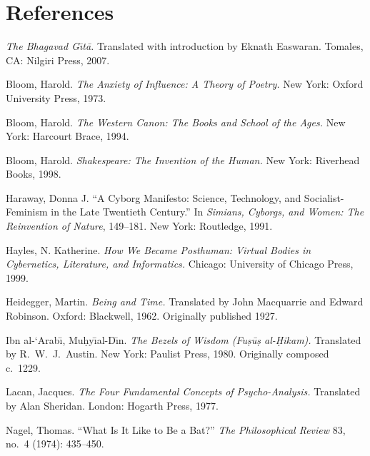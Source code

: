 \documentclass[11pt]{article}
\begin{document}
\section*{References}
\begin{description}[leftmargin=2em, style=unboxed, itemsep=0.35em]

\item[] \emph{The Bhagavad G\=\i t\=a.} Translated with introduction by Eknath Easwaran. Tomales, CA: Nilgiri Press, 2007.

\item[] Bloom, Harold. \emph{The Anxiety of Influence: A Theory of Poetry.} New York: Oxford University Press, 1973.

\item[] Bloom, Harold. \emph{The Western Canon: The Books and School of the Ages.} New York: Harcourt Brace, 1994.

\item[] Bloom, Harold. \emph{Shakespeare: The Invention of the Human.} New York: Riverhead Books, 1998.

\item[] Haraway, Donna J. \enquote{A Cyborg Manifesto: Science, Technology, and Socialist-Feminism in the Late Twentieth Century.} In \emph{Simians, Cyborgs, and Women: The Reinvention of Nature}, 149--181. New York: Routledge, 1991.

\item[] Hayles, N. Katherine. \emph{How We Became Posthuman: Virtual Bodies in Cybernetics, Literature, and Informatics.} Chicago: University of Chicago Press, 1999.

\item[] Heidegger, Martin. \emph{Being and Time.} Translated by John Macquarrie and Edward Robinson. Oxford: Blackwell, 1962. Originally published 1927.

\item[] Ibn al-{`}Arab\=\i, Mu\d{h}y\=\i al-D\=\i n. \emph{The Bezels of Wisdom (Fu\d{s}\=u\d{s} al-\d{H}ikam).} Translated by R.\ W.\ J.\ Austin. New York: Paulist Press, 1980. Originally composed c.\ 1229.

\item[] Lacan, Jacques. \emph{The Four Fundamental Concepts of Psycho-Analysis.} Translated by Alan Sheridan. London: Hogarth Press, 1977.

\item[] Nagel, Thomas. \enquote{What Is It Like to Be a Bat?} \emph{The Philosophical Review} 83, no.\ 4 (1974): 435--450.


\end{description}
\end{document}
